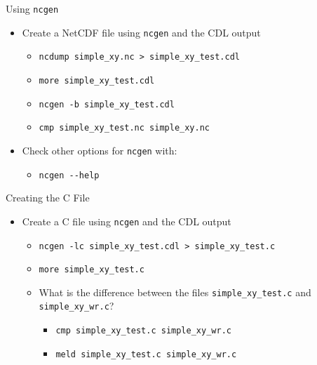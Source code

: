 \documentclass[compress,11pt,xcolor=svgnames,aspectratio=169]{beamer}
\begin{document}
\begin{frame}[fragile]{Using \texttt{ncgen}}

\begin{itemize}
\setlength\itemsep{0.4cm}

  \item Create a NetCDF file using \texttt{ncgen} and the CDL output\\[0.4cm]

    \begin{itemize}
    \setlength\itemsep{0.3cm}

      \item \verb|ncdump simple_xy.nc > simple_xy_test.cdl|
      \item \verb|more simple_xy_test.cdl|
      \item \verb|ncgen -b simple_xy_test.cdl|
      \item \verb|cmp simple_xy_test.nc simple_xy.nc|

    \end{itemize}

  \item Check other options for \texttt{ncgen} with:\\[0.4cm]

    \begin{itemize}

      \item \verb|ncgen --help|

    \end{itemize}

\end{itemize}

\end{frame}

\begin{frame}[fragile]{Creating the C File}

\begin{itemize}
\setlength\itemsep{0.4cm}

  \item Create a C file using \texttt{ncgen} and the CDL output\\[0.4cm]

  \begin{itemize}
  \setlength\itemsep{0.5cm}

    \item \verb|ncgen -lc simple_xy_test.cdl > simple_xy_test.c|
    \item \verb|more simple_xy_test.c|
    \item What is the difference between the files \verb|simple_xy_test.c| and \verb|simple_xy_wr.c|?

    \begin{itemize}
      \item \verb|cmp simple_xy_test.c simple_xy_wr.c|
      \item \verb|meld simple_xy_test.c simple_xy_wr.c|
    \end{itemize}

  \end{itemize}

\end{itemize}

\end{frame}
\end{document}
